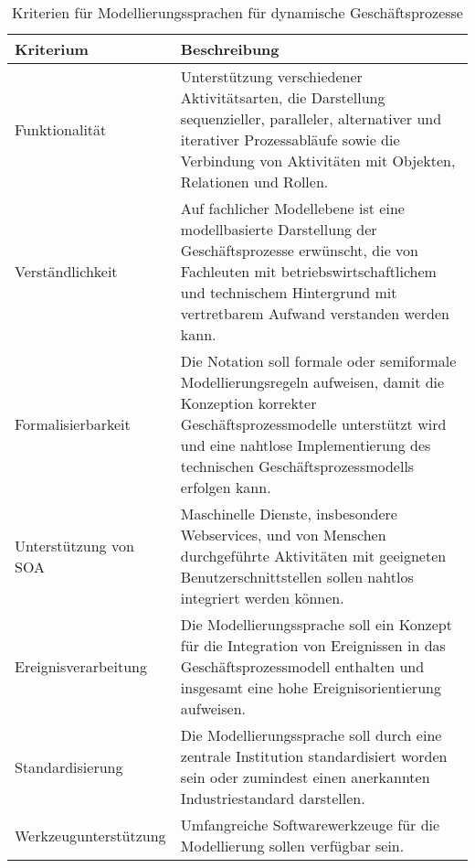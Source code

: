 \begin{table}[H]
	\centering
	\begin{tabularx}{\textwidth}{l X} 
		\toprule
		\textbf{Kriterium}  &   
		\textbf{Beschreibung}  \\ 
		\midrule
		Funktionalität &   
		Unterstützung verschiedener Aktivitätsarten, die Darstellung sequenzieller, paralleler, alternativer und iterativer Prozessabläufe sowie die Verbindung von Aktivitäten mit Objekten, Relationen und Rollen.   \\  \cmidrule(r){1-1} \cmidrule(r){2-2}
		
		Verständlichkeit &   
		Auf fachlicher Modellebene ist eine modellbasierte Darstellung der Geschäftsprozesse erwünscht, die von Fachleuten mit betriebswirtschaftlichem und technischem Hintergrund mit vertretbarem Aufwand verstanden werden kann. \\ \cmidrule(r){1-1} \cmidrule(r){2-2}
		
		Formalisierbarkeit &   
		Die Notation soll formale oder semiformale Modellierungsregeln aufweisen, damit die Konzeption korrekter Geschäftsprozessmodelle unterstützt wird und eine nahtlose Implementierung des technischen Geschäftsprozessmodells erfolgen kann.  \\ \cmidrule(r){1-1} \cmidrule(r){2-2}
		
		Unterstützung von \ac{SOA} &   
		Maschinelle Dienste, insbesondere Webservices, und von Menschen durchgeführte Aktivitäten mit geeigneten Benutzerschnittstellen sollen nahtlos integriert werden können.  \\ \cmidrule(r){1-1} \cmidrule(r){2-2}
		
		Ereignisverarbeitung &   
		Die Modellierungssprache soll ein Konzept für die Integration von Ereignissen in das Geschäftsprozessmodell enthalten und insgesamt eine hohe Ereignisorientierung aufweisen.   \\ \cmidrule(r){1-1} \cmidrule(r){2-2}
		
		Standardisierung &   
		Die Modellierungssprache soll durch eine zentrale Institution standardisiert worden sein oder zumindest einen anerkannten Industriestandard darstellen. \\ \cmidrule(r){1-1} \cmidrule(r){2-2}
		
		Werkzeugunterstützung &   
		Umfangreiche Softwarewerkzeuge für die Modellierung sollen verfügbar sein.  \\
	    \bottomrule
	\end{tabularx}
	\caption[Kriterien für Modellierungssprachen]
    {Kriterien für Modellierungssprachen für dynamische Geschäftsprozesse}
    \label{tab:Kriterien für Modellierungssprachen}
\end{table}

